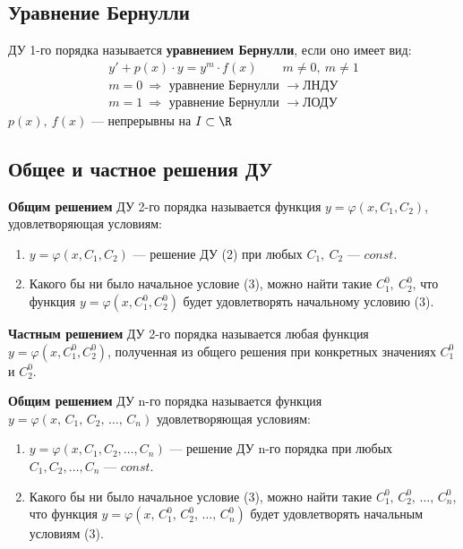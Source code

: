 \subsection{Уравнение Бернулли}
\begin{definition}
    ДУ 1-го порядка называется \textbf{уравнением Бернулли}, если оно имеет вид:
    \begin{gather*}
        \boxed{y' + p(x) \cdot y = y^{m} \cdot f(x)}\qquad m \ne 0,\ m \ne 1 \\[1ex]
        m = 0\ \Rightarrow \text{ уравнение Бернулли } \longrightarrow \text{ЛНДУ} \\
        m = 1\ \Rightarrow \text{ уравнение Бернулли } \longrightarrow \text{ЛОДУ} 
    \end{gather*}
    $p(x),\ f(x)$ --- непрерывны на $I \subset \R$
\end{definition}

\subsection{Общее и частное решения ДУ}

\begin{definition}
    \textbf{Общим решением} ДУ 2-го порядка называется функция \break$y = \varphi(x, C_1, C_2)$, удовлетворяющая условиям:
    \begin{enumerate}
        \item $y = \varphi(x, C_1, C_2)$ --- решение ДУ (2) при любых $C_1,\ C_2$ --- $const$.
        \item Какого бы ни было начальное условие (3), можно найти такие $C_1^0,\ C_2^0$, что функция $y = \varphi(x, C_1^0, C_2^0)$ будет удовлетворять начальному условию (3).
    \end{enumerate}
\end{definition}

\newpage
\begin{definition}
    \textbf{Частным решением} ДУ 2-го порядка называется любая функция $y = \varphi(x, C_1^0, C_2^0)$, полученная из общего решения при конкретных значениях $C_1^0$ и $C_2^0$.
\end{definition}

\begin{definition}
    \textbf{Общим решением} ДУ n-го порядка называется функция\break$y = \varphi(x,\, C_1,\, C_2,\, \ldots,\, C_n)$ удовлетворяющая условиям:
    \begin{enumerate}
        \item $y = \varphi(x, C_1, C_2, \ldots, C_n)$ --- решение ДУ n-го порядка при любых $C_1, C_2, \ldots, C_n$ --- $const$.
        \item Какого бы ни было начальное условие (3), можно найти такие $C_1^0,\, C_2^0,\, \ldots,\, C_n^0$, что функция $y = \varphi(x,\, C_1^0,\, C_2^0,\, \ldots,\, C_n^0)$ будет удовлетворять начальным условиям (3).
    \end{enumerate}
\end{definition}

